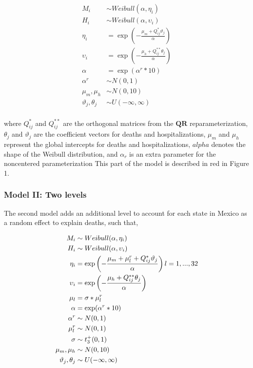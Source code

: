 \documentclass[10pt,letterpaper]{article}
\begin{document}
\[
\begin{aligned}
 {M_i}  &\sim Weibull(\alpha,\eta_i)\\
 {H_i}  &\sim Weibull(\alpha,\upsilon_i) \\
 \eta_i &= \exp\left(-\frac{\mu_m+Q_{ij}^*\vartheta_{j}}{\alpha}\right) \\
 \upsilon_i &= \exp\left(-\frac{\mu_h+Q_{ij}^{**}\theta_{j}}{\alpha}\right) \\
 \alpha&=\exp(\alpha^r*10) \\
 \alpha^r&\sim N(0,1) \\
 \mu_m,\mu_h &\sim N(0,10) \\
 \vartheta_j,\theta_j &\sim U(-\infty,\infty) \\
\end{aligned}
\]

where \(Q_{ij}^*\) and \(Q_{ij}^{**}\) are the orthogonal matrices from
the \(\mathbf{QR}\) reparameterization, \(\theta_j\) and \(\vartheta_j\)
are the coefficient vectors for deaths and hospitalizations, \(\mu_m\)
and \(\mu_h\) represent the global intercepts for deaths and
hospitalizations, \(alpha\) denotes the shape of the Weibull
distribution, and \(\alpha_r\) is an extra parameter for the noncentered
parameterization This part of the model is described in red in Figure 1.

\hypertarget{model-ii-two-levels}{%
\subsubsection{Model II: Two levels}\label{model-ii-two-levels}}

The second model adds an additional level to account for each state in
Mexico as a random effect to explain deaths, such that,

\[
\begin{aligned}
 {M_i}  &\sim Weibull(\alpha,\eta_i)\\
 {H_i}  &\sim Weibull(\alpha,\upsilon_i) \\
 \eta_i &= \exp\left(-\frac{\mu_m+\mu_l^r+Q_{ij}^*\vartheta_{j}}{\alpha}\right)\space\space l=1,...,32 \\
 \upsilon_i &= \exp\left(-\frac{\mu_h+Q_{ij}^{**}\theta_{j}}{\alpha}\right) \\
 \mu_l&=\sigma*\mathbf{\mu}_l^r \\
 \alpha&=\exp(\alpha^r*10) \\
 \alpha^r&\sim N(0,1) \\
 \mu^r_l&\sim N(0,1) \\
 \sigma&\sim t^+_3(0,1) \\
 \mu_m,\mu_h &\sim N(0,10) \\
 \vartheta_j,\theta_j &\sim U(-\infty,\infty) \\
\end{aligned}
\]
\end{document}
